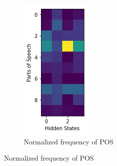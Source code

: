 \begin{figure}[H]
	\begin{subfigure}[t]{0.2\textwidth}
		\includegraphics[width=\textwidth]{4states_normalized.png}
		\caption{Normalized frequency of POS}
	\end{subfigure}%

\end{figure}
